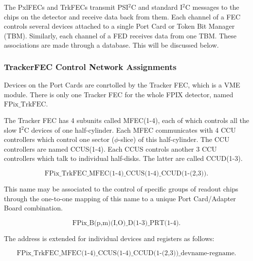 \documentclass{cmspaper}
\begin{document}
The PxlFECs and TrkFECs transmit PSI$^{2}$C and standard I$^{2}$C messages 
to the chips on the detector and receive data back from them. Each channel of a FEC controls
several devices attached to a single Port Card or Token Bit Manager (TBM). 
Similarly, each channel 
of a FED receives data from one TBM. These associations are made through a
database. This will be discussed below.


\subsubsection{TrackerFEC Control Network Assignments}

Devices on the Port Cards are conrtolled by the Tracker FEC, which is a VME 
module. There is only one Tracker FEC for the whole FPIX detector, named 
$\mbox{FPix\_TrkFEC.}$

The Tracker FEC has 4 subunits called MFEC(1-4), each of  which 
controls all the slow I$^{2}$C devices of one  
half-cylinder. Each MFEC communicates with 4 CCU controllers which
control one sector ($\phi$-slice) of this half-cylinder. The CCU controllers are named 
CCUS(1-4). Each CCUS controls another 3 CCU controllers which talk to 
individual half-disks. The latter are called CCUD(1-3). 

\begin{displaymath}
\mbox{FPix\_TrkFEC\_MFEC(1-4)\_CCUS(1-4)\_CCUD(1-(2,3)).}
\end{displaymath}

This name may be associated to the control of specific groups of readout
chips through the one-to-one mapping of this name to a unique 
Port Card/Adapter Board combination.

\begin{displaymath}
\mbox{FPix\_B(p,m)(I,O)\_D(1-3)\_PRT(1-4).}
\end{displaymath}

The address is extended for individual
devices and registers as follows:

\begin{displaymath}
\mbox{FPix\_TrkFEC\_MFEC(1-4)\_CCUS(1-4)\_CCUD(1-(2,3))\_devname-regname.}
\end{displaymath}
\end{document}

